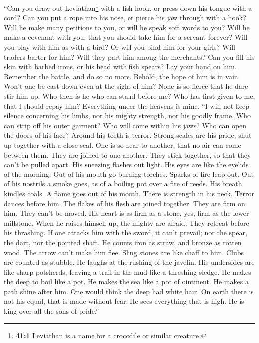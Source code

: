  ``Can you draw out Leviathan\footnote{\textbf{41:1}
  Leviathan is a name for a crocodile or similar creature.} with a fish
hook, or press down his tongue with a cord?  Can you put a
rope into his nose, or pierce his jaw through with a hook?
 Will he make many petitions to you, or will he speak soft
words to you?  Will he make a covenant with you, that you
should take him for a servant forever?  Will you play with
him as with a bird? Or will you bind him for your girls? 
Will traders barter for him? Will they part him among the merchants?
 Can you fill his skin with barbed irons, or his head with
fish spears?  Lay your hand on him. Remember the battle,
and do so no more.  Behold, the hope of him is in vain.
Won't one be cast down even at the sight of him?  None is
so fierce that he dare stir him up. Who then is he who can stand before
me?  Who has first given to me, that I should repay him?
Everything under the heavens is mine.  ``I will not keep
silence concerning his limbs, nor his mighty strength, nor his goodly
frame.  Who can strip off his outer garment? Who will
come within his jaws?  Who can open the doors of his
face? Around his teeth is terror.  Strong scales are his
pride, shut up together with a close seal.  One is so
near to another, that no air can come between them.  They
are joined to one another. They stick together, so that they can't be
pulled apart.  His sneezing flashes out light. His eyes
are like the eyelids of the morning.  Out of his mouth go
burning torches. Sparks of fire leap out.  Out of his
nostrils a smoke goes, as of a boiling pot over a fire of reeds.
 His breath kindles coals. A flame goes out of his mouth.
 There is strength in his neck. Terror dances before him.
 The flakes of his flesh are joined together. They are
firm on him. They can't be moved.  His heart is as firm
as a stone, yes, firm as the lower millstone.  When he
raises himself up, the mighty are afraid. They retreat before his
thrashing.  If one attacks him with the sword, it can't
prevail; nor the spear, the dart, nor the pointed shaft. 
He counts iron as straw, and bronze as rotten wood.  The
arrow can't make him flee. Sling stones are like chaff to him.
 Clubs are counted as stubble. He laughs at the rushing
of the javelin.  His undersides are like sharp potsherds,
leaving a trail in the mud like a threshing sledge.  He
makes the deep to boil like a pot. He makes the sea like a pot of
ointment.  He makes a path shine after him. One would
think the deep had white hair.  On earth there is not his
equal, that is made without fear.  He sees everything
that is high. He is king over all the sons of pride.''

